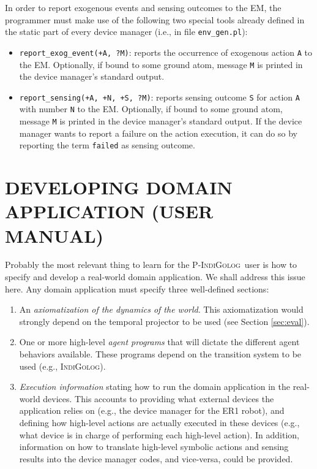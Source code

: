 \documentclass[11pt]{article}
\newcommand{\PIndiGolog}{\mbox{\textsc{P-IndiGolog}}}
\newcommand{\IndiGolog}{\mbox{\textsc{IndiGolog}}}
\begin{document}
In order to report exogenous events and sensing outcomes to the EM, the
programmer must make use of the following two special tools already defined in
the static part of every device manager (i.e., in file \texttt{env\_gen.pl}):

\begin{itemize}
\item \texttt{report\_exog\_event(+A, ?M)}: reports the occurrence of exogenous
  action \texttt{A} to the EM. Optionally, if bound to some ground atom, message
  \texttt{M} is printed in the device manager's standard output.
  
\item \texttt{report\_sensing(+A, +N, +S, ?M)}: reports sensing outcome
\texttt{S} for action \texttt{A} with number \texttt{N} to the EM.
Optionally, if bound to some ground atom, message \texttt{M} is printed in the
device manager's standard output. If the device manager wants to report a
failure on the action execution, it can do so by reporting the
term \texttt{failed} as sensing outcome.
\end{itemize}



\section{DEVELOPING DOMAIN APPLICATION (USER MANUAL)\label{sec:user}}

Probably the most relevant thing to learn for the \PIndiGolog\ user is how to
specify and develop a real-world domain application. We shall address this
issue here.
%
Any domain application must specify three well-defined sections:
%
\begin{enumerate}
\item An \emph{axiomatization of the dynamics of the world}. This
  axiomatization would strongly depend on the temporal projector to be used (see
  Section \ref{sec:eval}).
  
\item One or more high-level \emph{agent programs} that will dictate the
different agent behaviors available. These programs depend on the transition
system to be used (e.g., \IndiGolog).
  
\item \textit{Execution information} stating how to run the domain application
in the real-world devices. This accounts to providing what external devices the
application relies on (e.g., the device manager for the ER1 robot), and defining
how high-level actions are actually executed in these devices (e.g., what
device is in charge of performing each high-level action). 
%
In addition, information on how to translate high-level symbolic actions and
sensing results into the device manager codes, and vice-versa, could be
provided.
\end{enumerate}
\end{document}
